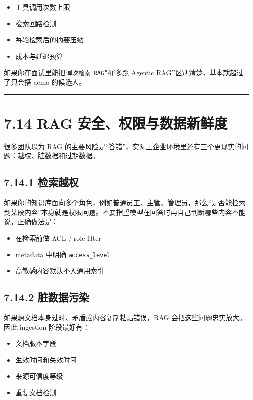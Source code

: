 \begin{itemize}[leftmargin=2em]
\item 工具调用次数上限
\item 检索回路检测
\item 每轮检索后的摘要压缩
\item 成本与延迟预算
\end{itemize}

如果你在面试里能把`\texttt{单次检索 RAG''和}`多跳 Agentic RAG''区别清楚，基本就超过了只会搭 demo 的候选人。


\bigskip\hrule\bigskip

\section{7.14 RAG 安全、权限与数据新鲜度}

很多团队以为 RAG 的主要风险是``答错''，实际上企业环境里还有三个更现实的问题：越权、脏数据和过期数据。


\subsection{7.14.1 检索越权}

如果你的知识库面向多个角色，例如普通员工、主管、管理员，那么``是否能检索到某段内容''本身就是权限问题。不要指望模型在回答时再自己判断哪些内容不能说，正确做法是：


\begin{itemize}[leftmargin=2em]
\item 在检索前做 ACL / role filter
\item metadata 中明确 \texttt{access\_level}
\item 高敏感内容默认不入通用索引
\end{itemize}

\subsection{7.14.2 脏数据污染}

如果源文档本身过时、矛盾或内容复制粘贴错误，RAG 会把这些问题忠实放大。因此 ingestion 阶段最好有：


\begin{itemize}[leftmargin=2em]
\item 文档版本字段
\item 生效时间和失效时间
\item 来源可信度等级
\item 重复文档检测
\end{itemize}

